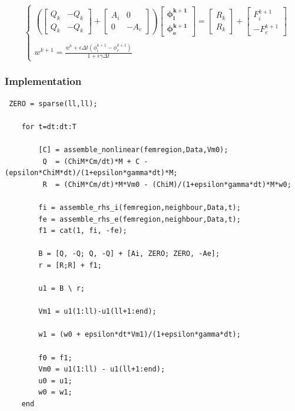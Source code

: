 \documentclass[a4paper,11pt]{article}
\begin{document}
\begin{equation}
\quad
\begin{cases}
\left(
\begin{bmatrix} Q_k & -Q_k \\ Q_k & -Q_k \end{bmatrix} + 
\begin{bmatrix} A_i & 0 \\ 0 & -A_e\end{bmatrix}
\right)
\begin{bmatrix}
\bm{\phi_i^{k+1}} \\ \bm{\phi_e^{k+1}}
\end{bmatrix}
= \begin{bmatrix} R_k \\ R_k \end{bmatrix} + \begin{bmatrix} F_i^{k+1} \\  -F_e^{k+1}\end{bmatrix} \\ \\
w^{k+1} = \frac{\displaystyle w^k + \epsilon \Delta t (\phi_i^{k+1}-\phi_e^{k+1})}{\displaystyle 1+\epsilon \gamma \Delta t}
\end{cases}
\end{equation}

\subsubsection{Implementation}
\begin{verbatim}
 ZERO = sparse(ll,ll);
        
    for t=dt:dt:T
        
        [C] = assemble_nonlinear(femregion,Data,Vm0);
         Q  = (ChiM*Cm/dt)*M + C - (epsilon*ChiM*dt)/(1+epsilon*gamma*dt)*M;
         R  = (ChiM*Cm/dt)*M*Vm0 - (ChiM)/(1+epsilon*gamma*dt)*M*w0;
    
        fi = assemble_rhs_i(femregion,neighbour,Data,t);
        fe = assemble_rhs_e(femregion,neighbour,Data,t);
        f1 = cat(1, fi, -fe);
    
        B = [Q, -Q; Q, -Q] + [Ai, ZERO; ZERO, -Ae];
        r = [R;R] + f1;
        
        u1 = B \ r; 
        
        Vm1 = u1(1:ll)-u1(ll+1:end);

        w1 = (w0 + epsilon*dt*Vm1)/(1+epsilon*gamma*dt);
    
        f0 = f1;
        Vm0 = u1(1:ll) - u1(ll+1:end);
        u0 = u1;
        w0 = w1;
    end
\end{verbatim}


    \newpage
    \printbibliography
\end{document}
